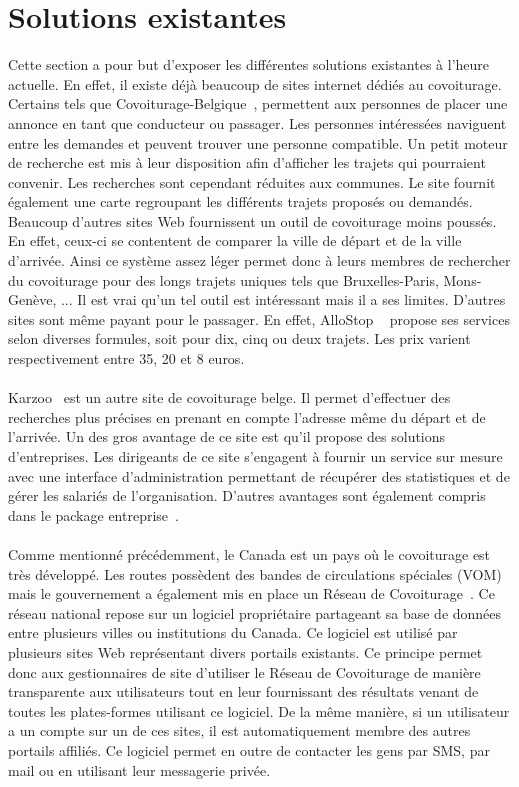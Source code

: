 \documentclass[12pt, a4paper, oneside]{article}
\begin{document}
\section{Solutions existantes}\label{sol-ex}
    Cette section a pour but d'exposer les différentes solutions existantes à l'heure actuelle. En effet, il existe déjà beaucoup de sites internet dédiés au covoiturage. Certains tels que Covoiturage-Belgique~\cite{covoiturage-belgique}, permettent aux personnes de placer une annonce en tant que conducteur ou passager. Les personnes intéressées naviguent entre les demandes et peuvent trouver une personne compatible. Un petit moteur de recherche est mis à leur disposition afin d'afficher les trajets qui pourraient convenir. Les recherches sont cependant réduites aux communes. Le site fournit également une carte regroupant les différents trajets proposés ou demandés. Beaucoup d'autres sites Web fournissent un outil de covoiturage moins poussés. En effet, ceux-ci se contentent de comparer la ville de départ et de la ville d'arrivée. Ainsi ce système assez léger permet donc à leurs membres de rechercher du covoiturage pour des longs trajets uniques tels que Bruxelles-Paris, Mons-Genève, ... Il est vrai qu'un tel outil est intéressant mais il a ses limites. D'autres sites sont même payant pour le passager. En effet, AlloStop ~\cite{allostop} propose ses services selon diverses formules, soit pour dix, cinq ou deux trajets. Les prix varient respectivement entre 35, 20 et 8 euros.\\\\
    \indent Karzoo~\cite{karzoo.be} est un autre site de covoiturage belge. Il permet d'effectuer des recherches plus précises en prenant en compte l'adresse même du départ et de l'arrivée. Un des gros avantage de ce site est qu'il propose des solutions d'entreprises. Les dirigeants de ce site s'engagent à fournir un service sur mesure avec une interface d'administration permettant de récupérer des statistiques et de gérer les salariés de l'organisation. D'autres avantages sont également compris dans le package entreprise~\cite{karzoo.be-entreprise}.\\\\
    \indent Comme mentionné précédemment, le Canada est un pays où le covoiturage est très développé. Les routes possèdent des bandes de circulations spéciales (VOM) mais le gouvernement a également mis en place un Réseau de Covoiturage~\cite{covoiturage.ca}. Ce réseau national repose sur un logiciel propriétaire partageant sa base de données entre plusieurs villes ou institutions du Canada. Ce logiciel est utilisé par plusieurs sites Web représentant divers portails existants. Ce principe permet donc aux gestionnaires de site d'utiliser le Réseau de Covoiturage de manière transparente aux utilisateurs tout en leur fournissant des résultats venant de toutes les plates-formes utilisant ce logiciel. De la même manière, si un utilisateur a un compte sur un de ces sites, il est automatiquement membre des autres portails affiliés. Ce logiciel permet en outre de contacter les gens par SMS, par mail ou en utilisant leur messagerie privée.\\\\
\end{document}
